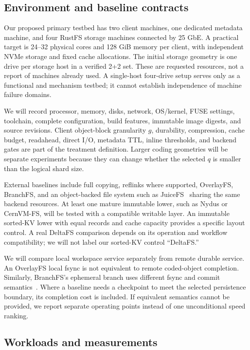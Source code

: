 \subsection{Environment and baseline contracts}

Our proposed primary testbed has two client machines, one dedicated metadata
machine, and four RustFS storage machines connected by 25 GbE. A practical
target is 24--32 physical cores and 128 GiB memory per client, with independent
NVMe storage and fixed cache allocations. The initial storage geometry is
one drive per storage host in a verified 2+2 set. These are requested resources,
not a report of machines already used. A single-host four-drive setup serves
only as a functional and mechanism testbed; it cannot establish independence
of machine failure domains.

We will record processor, memory, disks, network, OS/kernel, FUSE settings,
toolchain, complete configuration, build features, immutable image digests,
and source revisions. Client object-block granularity $g$, durability,
compression, cache budget, readahead,
direct I/O, metadata TTL, inline thresholds, and backend gates are part of
the treatment definition. Larger coding geometries will be separate
experiments because they can change whether the selected $q$ is smaller than
the logical shard size.

External baselines include full copying, reflinks where supported, OverlayFS,
BranchFS, and an object-backed file system such as JuiceFS~\cite{juicefs_architecture} sharing the same
backend resources. At least one mature immutable lower, such as Nydus or
CernVM-FS, will be tested with a compatible writable layer. An immutable
sorted-KV lower with equal records and cache capacity provides a specific
layout control. A real DeltaFS comparison depends on its operation and
workflow compatibility; we will not label our sorted-KV control ``DeltaFS.''

We will compare local workspace service separately from remote durable
service. An OverlayFS local fsync is not equivalent to remote coded-object
completion. Similarly, BranchFS's ephemeral branch uses different fsync and
commit semantics~\cite{branchfs2026}. Where a baseline needs a checkpoint to
meet the selected persistence boundary, its completion cost is included.
If equivalent semantics cannot be provided, we report separate operating
points instead of one unconditional speed ranking.

\subsection{Workloads and measurements}

